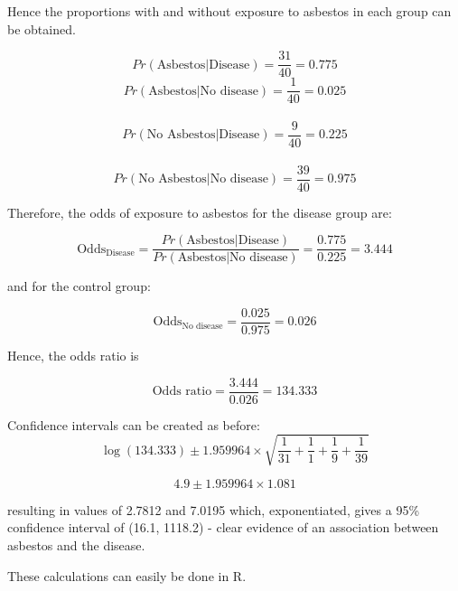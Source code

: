 \documentclass[
  oneside]{krantz}
\newenvironment{Shaded}{\begin{snugshade}}{\end{snugshade}}
\newcommand{\AttributeTok}[1]{\textcolor[rgb]{0.77,0.63,0.00}{#1}}
\newcommand{\CommentTok}[1]{\textcolor[rgb]{0.56,0.35,0.01}{\textit{#1}}}
\newcommand{\DecValTok}[1]{\textcolor[rgb]{0.00,0.00,0.81}{#1}}
\newcommand{\DocumentationTok}[1]{\textcolor[rgb]{0.56,0.35,0.01}{\textbf{\textit{#1}}}}
\newcommand{\FunctionTok}[1]{\textcolor[rgb]{0.00,0.00,0.00}{#1}}
\newcommand{\NormalTok}[1]{#1}
\newcommand{\OtherTok}[1]{\textcolor[rgb]{0.56,0.35,0.01}{#1}}
\newcommand{\SpecialCharTok}[1]{\textcolor[rgb]{0.00,0.00,0.00}{#1}}
\newcommand{\StringTok}[1]{\textcolor[rgb]{0.31,0.60,0.02}{#1}}
\begin{document}
Hence the proportions with and without exposure to asbestos in each group can be obtained.

\[Pr(\textrm{Asbestos|Disease}) = \frac{31}{40}  = 0.775\]
\[Pr(\textrm{Asbestos|No disease}) = \frac{1}{40} = 0.025\]\\
\[Pr(\textrm{No Asbestos|Disease}) = \frac{9}{40} = 0.225\]\\
\[Pr(\textrm{No Asbestos|No disease}) = \frac{39}{40} = 0.975\]

Therefore, the odds of exposure to asbestos for the disease group are:

\[\textrm{Odds}_{\textrm{Disease}} = \frac{Pr(\textrm{Asbestos|Disease})}{Pr(\textrm{Asbestos|No disease})} = \frac{0.775}{0.225} =  3.444\]

and for the control group:

\[\textrm{Odds}_{\textrm{No disease}} = \frac{0.025}{0.975} = 0.026\]

Hence, the odds ratio is

\[\textrm{Odds ratio} = \frac{3.444}{0.026} = 134.333\]

Confidence intervals can be created as before:
\[\log(134.333)\pm 1.959964 \times \sqrt{\frac{1}{31}+\frac{1}{1}+\frac{1}{9}+\frac{1}{39}}\]

\[4.9 \pm  1.959964 \times 1.081\]

resulting in values of 2.7812 and 7.0195 which, exponentiated, gives a 95\% confidence interval of (16.1, 1118.2) - clear evidence of an association between asbestos and the disease.

These calculations can easily be done in R.

\begin{Shaded}
\end{Shaded}
\end{document}
